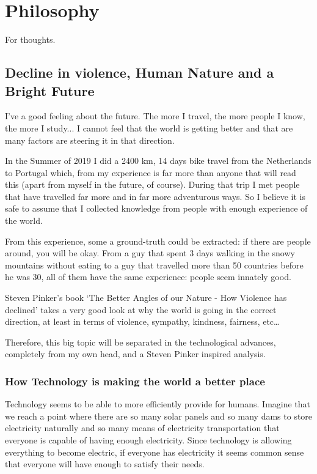 \section{Philosophy}
For thoughts.

\subsection{Decline in violence, Human Nature and a Bright Future}
I've a good feeling about the future. The more I travel, the more people I know, the more I study... I cannot feel that the world is getting better and that are many factors are steering it in that direction.


In the Summer of 2019 I did a 2400 km, 14 days bike travel from the Netherlands to Portugal which, from my experience is far more than anyone that will read this (apart from myself in the future, of course). During that trip I met people that have travelled far more and in far more adventurous ways. So I believe it is safe to assume that I collected knowledge from people with enough experience of the world. 

From this experience, some a ground-truth could be extracted: if there are people around, you will be okay. From a guy that spent 3 days walking in the snowy mountains without eating to a guy that travelled more than 50 countries before he was 30, all of them have the same experience: people seem innately good.

Steven Pinker's book `The Better Angles of our Nature - How Violence has declined' takes a very good look at why the world is going in the correct direction, at least in terms of violence, sympathy, kindness, fairness, etc\dots

Therefore, this big topic will be separated in the technological advances, completely from my own head, and a Steven Pinker inspired analysis.

\subsubsection{How Technology is making the world a better place}
Technology seems to be able to more efficiently provide for humans. Imagine that we reach a point where there are so many solar panels and so many dams to store electricity naturally and so many means of electricity transportation that everyone is capable of having enough electricity. Since technology is allowing everything to become electric, if everyone has electricity it seems common sense that everyone will have enough to satisfy their needs. 

